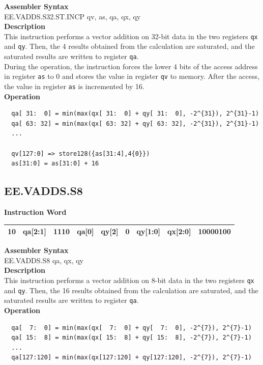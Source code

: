 \textbf{Assembler Syntax} \\
EE.VADDS.S32.ST.INCP qv, as, qa, qx, qy \\
\textbf{Description} \\
This instruction performs a vector addition on 32-bit data in the two registers \lstinline{qx} and \lstinline{qy}. Then, the 4 results obtained from the calculation are saturated, and the saturated results are written to register \lstinline{qa}. \\ During the operation, the instruction forces the lower 4 bits of the access address in register \lstinline{as} to 0 and stores the value in register \lstinline{qv} to memory. After the access, the value in register \lstinline{as} is incremented by 16.\\
\textbf{Operation}
\begin{lstlisting}
  qa[ 31:  0] = min(max(qx[ 31:  0] + qy[ 31:  0], -2^{31}), 2^{31}-1)
  qa[ 63: 32] = min(max(qx[ 63: 32] + qy[ 63: 32], -2^{31}), 2^{31}-1)
  ...

  qv[127:0] => store128({as[31:4],4{0}})
  as[31:0] = as[31:0] + 16
\end{lstlisting}

\clearpage
\subsection{EE.VADDS.S8}\label{instruction:EEVADDSS8}
\setlength\tabcolsep{6pt}
\textbf{Instruction Word} \\
\begin{tabular}{|c|c|c|c|c|c|c|c|c|}
	\hline
	10 & qa[2:1] & 1110 & qa[0] & qy[2] & 0 & qy[1:0] & qx[2:0] & 10000100 \\
	\hline
\end{tabular}

\textbf{Assembler Syntax} \\
EE.VADDS.S8 qa, qx, qy \\
\textbf{Description} \\
This instruction performs a vector addition on 8-bit data in the two registers \lstinline{qx} and \lstinline{qy}. Then, the 16 results obtained from the calculation are saturated, and the saturated results are written to register \lstinline{qa}.\\
\textbf{Operation}
\begin{lstlisting}
  qa[  7:  0] = min(max(qx[  7:  0] + qy[  7:  0], -2^{7}), 2^{7}-1)
  qa[ 15:  8] = min(max(qx[ 15:  8] + qy[ 15:  8], -2^{7}), 2^{7}-1)
  ...
  qa[127:120] = min(max(qx[127:120] + qy[127:120], -2^{7}), 2^{7}-1)
\end{lstlisting}

